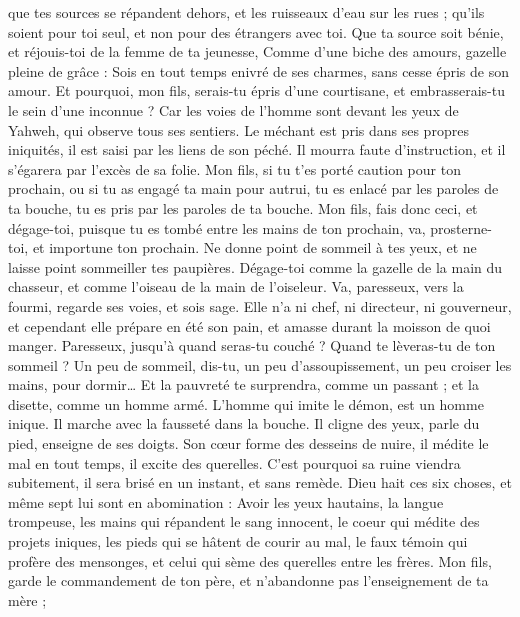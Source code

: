 \begin{multicols}{2}
que tes sources se répandent dehors, et les ruisseaux d'eau sur les rues ;
qu'ils soient pour toi seul, et non pour des étrangers avec toi.
Que ta source soit bénie, et réjouis-toi de la femme de ta jeunesse,
Comme d'une biche des amours, gazelle pleine de grâce : Sois en tout temps enivré de ses charmes, sans cesse épris de son amour.
Et pourquoi, mon fils, serais-tu épris d’une courtisane, et embrasserais-tu le sein d’une inconnue ?
Car les voies de l'homme sont devant les yeux de Yahweh, qui observe tous ses sentiers.
Le méchant est pris dans ses propres iniquités, il est saisi par les liens de son péché.
Il mourra faute d'instruction, et il s’égarera  par l’excès de sa folie.
\VerseOne{}Mon fils, si tu t’es porté caution pour ton prochain, ou si tu as engagé ta main pour autrui,
tu es enlacé par les paroles de ta bouche, tu es pris par les paroles de ta bouche.
Mon fils, fais donc ceci, et dégage-toi, puisque tu es tombé entre les mains de ton prochain, va, prosterne-toi, et importune ton prochain.
Ne donne point de sommeil à tes yeux, et ne laisse point sommeiller tes paupières.
Dégage-toi comme la gazelle de la main du chasseur, et comme l'oiseau de la main de l'oiseleur.
Va, paresseux, vers la fourmi, regarde ses voies, et sois sage.
Elle n'a ni chef, ni directeur, ni gouverneur,
et cependant elle prépare en été son pain, et amasse durant la moisson de quoi manger.
Paresseux, jusqu'à quand seras-tu couché ? Quand te lèveras-tu de ton sommeil ?
Un peu de sommeil, dis-tu, un peu d’assoupissement, un peu croiser les mains, pour dormir…
Et la pauvreté te surprendra, comme un passant ; et la disette, comme un homme armé.
L'homme qui imite le démon, est un homme inique. Il marche avec la fausseté dans la bouche.
Il cligne des yeux, parle du pied, enseigne de ses doigts.
Son cœur forme des desseins de nuire, il médite le mal en tout temps, il excite des querelles.
C'est pourquoi sa ruine viendra subitement, il sera brisé en un instant, et sans remède.
Dieu hait ces six choses, et même sept lui sont en abomination :
Avoir les yeux hautains, la langue trompeuse, les mains qui répandent le sang innocent,
le coeur qui médite des projets iniques, les pieds qui se hâtent de courir au mal,
le faux témoin qui profère des mensonges, et celui qui sème des querelles entre les frères.
Mon fils, garde le commandement de ton père, et n'abandonne pas l'enseignement de ta mère ;

\end{multicols}
